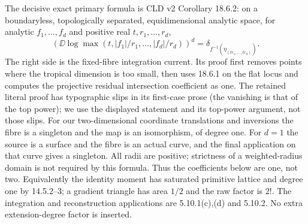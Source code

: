 The decisive exact primary formula is CLD v2 Corollary 18.6.2:
on a boundaryless, topologically separated, equidimensional analytic
space, for analytic $f_1,\ldots,f_d$ and positive real
$t,r_1,\ldots,r_d$,
\[
 (\DD\log\max(t,|f_1|/r_1,\ldots,|f_d|/r_d))^d
 =\delta_{f^{-1}(\eta_{(tr_1,\ldots,tr_d)})}.
\]
The right side is the fixed-fibre integration current. Its proof first
removes points where the tropical dimension is too small, then uses
18.6.1 on the flat locus and computes the projective residual intersection
coefficient as one. The retained literal proof has typographic slips in
its first-case prose (the vanishing is that of the top power); we use
the displayed statement and its top-power argument, not those slips.
For our two-dimensional coordinate translations and inversions the fibre
is a singleton and the map is an isomorphism, of degree one. For $d=1$
the source is a surface and the fibre is an actual curve, and the final
application on that curve gives a singleton. All radii are positive;
strictness of a weighted-radius domain is not required by this formula.
Thus the coefficients below are one, not two. Equivalently the
identity moment has saturated primitive lattice and degree one by
14.5.2--3; a gradient triangle has area $1/2$ and the raw factor is $2!$.
The integration and reconstruction applications are 5.10.1(c),(d)
and 5.10.2. No extra extension-degree factor is inserted.

